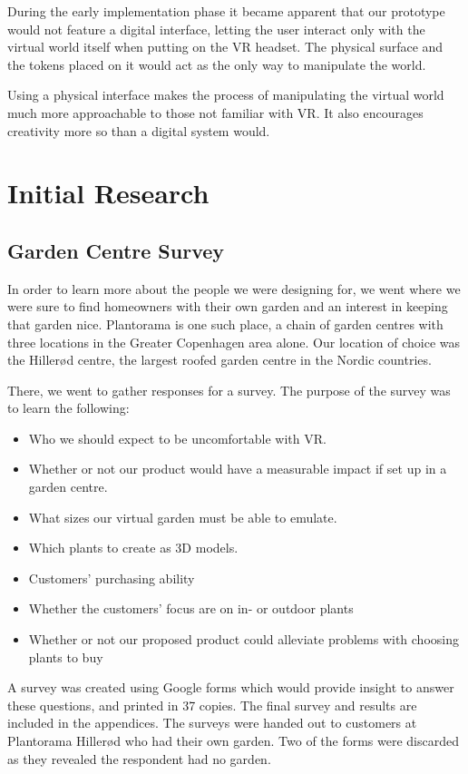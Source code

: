 During the early implementation phase it became apparent that our prototype would not feature a digital interface, letting the user interact only with the virtual world itself when putting on the VR headset. The physical surface and the tokens placed on it would act as the only way to manipulate the world.

Using a physical interface makes the process of manipulating the virtual world much more approachable to those not familiar with VR. It also encourages creativity more so than a digital system would. 




\section{Initial Research}
\subsection{Garden Centre Survey}

In order to learn more about the people we were designing for, we went where we were sure to find homeowners with their own garden and an interest in keeping that garden nice. Plantorama is one such place, a chain of garden centres with three locations in the Greater Copenhagen area alone. Our location of choice was the Hillerød centre, the largest roofed garden centre in the Nordic countries. 

There, we went to gather responses for a survey. 
The purpose of the survey was to learn the following:

\begin{itemize}
	\item Who we should expect to be uncomfortable with VR.
	\item Whether or not our product would have a measurable impact if set up in a garden centre.
	\item What sizes our virtual garden must be able to emulate.
	\item Which plants to create as 3D models.
	\item Customers' purchasing ability
	\item Whether the customers' focus are on in- or outdoor plants
	\item Whether or not our proposed product could alleviate problems with choosing plants to buy
\end{itemize}
A survey was created using Google forms which would provide insight to answer these questions, and printed in 37 copies. The final survey and results are included in the appendices. The surveys were handed out to customers at Plantorama Hillerød who had their own garden. Two of the forms were discarded as they revealed the respondent had no garden. %

